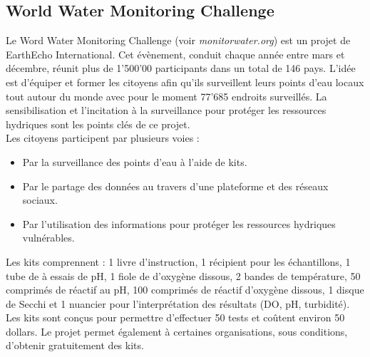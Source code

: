 \documentclass[10pt, article]{llncs}
\begin{document}
	\subsection{World Water Monitoring Challenge}
		Le Word Water Monitoring Challenge (voir \textit{monitorwater.org}) est un projet de EarthEcho International. Cet évènement, conduit chaque année entre mars et décembre, réunit plus de 1'500'00 participants dans un total de 146 pays. L'idée est d'équiper et former les citoyens afin qu'ils surveillent leurs points d'eau locaux tout autour du monde avec pour le moment 77'685 endroits surveillés. La sensibilisation et l'incitation à la surveillance pour protéger les ressources hydriques sont les points clés de ce projet. \\
		Les citoyens participent par plusieurs voies :
		\begin{itemize}
			\item Par la surveillance des points d'eau à l'aide de kits.
			\item Par le partage des données au travers d'une plateforme et des réseaux sociaux.
			\item Par l'utilisation des informations pour protéger les ressources hydriques vulnérables. 
		\end{itemize}
		Les kits comprennent : 1 livre d'instruction, 1 récipient pour les échantillons, 1 tube de à essais de pH, 1 fiole de d'oxygène dissous, 2 bandes de température, 50 comprimés de réactif au pH, 100 comprimés de réactif d'oxygène dissous, 1 disque de Secchi et 1 nuancier pour l'interprétation des résultats (DO, pH, turbidité). Les kits sont conçus pour permettre d'effectuer 50 tests et coûtent environ 50 dollars. Le projet permet également à certaines organisations, sous conditions, d'obtenir gratuitement des kits.
	
\end{document}

